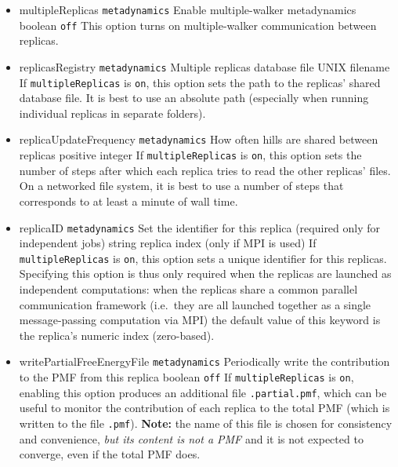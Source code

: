 \begin{itemize}

\item %
  \keydef
    {multipleReplicas}{%
    \texttt{metadynamics}}{%
    Enable multiple-walker metadynamics}{%
    boolean}{%
    \texttt{off}}{%
    This option turns on multiple-walker communication between replicas. }

\item %
  \key
    {replicasRegistry}{%
    \texttt{metadynamics}}{%
    Multiple replicas database file}{%
    UNIX filename}{%
    If \texttt{multipleReplicas} is \texttt{on}, this option sets the path to the replicas' shared database file.
    It is best to use an absolute path (especially when running individual replicas in separate folders).
  }

\item %
  \key
    {replicaUpdateFrequency}{%
    \texttt{metadynamics}}{%
    How often hills are shared between replicas}{%
    positive integer}{%
    If \texttt{multipleReplicas} is \texttt{on}, this option sets the number of steps after which each replica tries to read the other replicas' files.
    On a networked file system, it is best to use a number of steps that corresponds to at least a minute of wall time.
  }

\item %
  \keydef
    {replicaID}{%
    \texttt{metadynamics}}{%
    Set the identifier for this replica (required only for independent jobs)}{%
    string}{%
    replica index (only if MPI is used)}{%
    If \texttt{multipleReplicas} is \texttt{on}, this option sets a unique identifier for this replicas.
    Specifying this option is thus only required when the replicas are launched as independent computations:
    when the replicas share a common parallel communication framework (i.e.\ they are all launched together as a single message-passing computation via MPI) the default value of this keyword is the replica's numeric index (zero-based).
}

\item %
  \keydef
    {writePartialFreeEnergyFile}{%
    \texttt{metadynamics}}{%
    Periodically write the contribution to the
    PMF from this replica}{%
    boolean}{%
    \texttt{off}}{%
    If \texttt{multipleReplicas} is \texttt{on}, enabling this option produces  an additional file \outputName\texttt{.partial.pmf}, which can be useful to monitor the contribution of each replica to the total PMF (which is written to the file \outputName\texttt{.pmf}).
    \textbf{Note:} the name of this file is chosen for consistency and convenience, \emph{but its content is not a PMF} and it is not expected to converge, even if the total PMF does.
}

\end{itemize}


